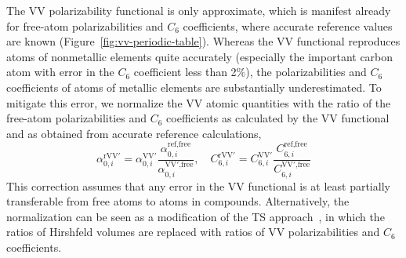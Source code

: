 The VV polarizability functional is only approximate, which is manifest already for free-atom polarizabilities and $C_6$ coefficients, where accurate reference values are known (Figure~\ref{fig:vv-periodic-table}).
Whereas the VV functional reproduces atoms of nonmetallic elements quite accurately (especially the important carbon atom with error in the $C_6$ coefficient less than 2\%), the polarizabilities and $C_6$ coefficients of atoms of metallic elements are substantially underestimated.
To mitigate this error, we normalize the VV atomic quantities with the ratio of the free-atom polarizabilities and $C_6$ coefficients as calculated by the VV functional and as obtained from accurate reference calculations,
\begin{equation}
  \alpha_{0,i}^\text{rVV$'$}=\alpha_{0,i}^\mathrm{VV'}\frac{\alpha_{0,i}^\text{ref,free}}{\alpha_{0,i}^\text{VV$'$,free}},\quad
  C_{6,i}^\text{rVV$'$}=C_{6,i}^\mathrm{VV'}\frac{C_{6,i}^\text{ref,free}}{C_{6,i}^\text{VV$'$,free}}
\end{equation}
This correction assumes that any error in the VV functional is at least partially transferable from free atoms to atoms in compounds.
Alternatively, the normalization can be seen as a modification of the TS approach~\citep{TkatchenkoPRL09}, in which the ratios of Hirshfeld volumes are replaced with ratios of VV polarizabilities and $C_6$ coefficients.



